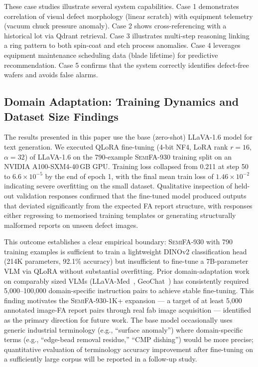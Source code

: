 \documentclass[conference]{IEEEtran}
\newcommand{\semidataset}{\textsc{SemiFA-930}}
\begin{document}
These case studies illustrate several system capabilities.
Case 1 demonstrates correlation of visual defect morphology (linear scratch) with equipment telemetry (vacuum chuck pressure anomaly).
Case 2 shows cross-referencing with a historical lot via Qdrant retrieval.
Case 3 illustrates multi-step reasoning linking a ring pattern to both spin-coat and etch process anomalies.
Case 4 leverages equipment maintenance scheduling data (blade lifetime) for predictive recommendation.
Case 5 confirms that the system correctly identifies defect-free wafers and avoids false alarms.

\subsection{Domain Adaptation: Training Dynamics and Dataset Size Findings}

The results presented in this paper use the base (zero-shot) LLaVA-1.6 model for text generation.
We executed QLoRA fine-tuning (4-bit NF4, LoRA rank $r=16$, $\alpha=32$) of LLaVA-1.6 on the 790-example \semidataset{} training split on an NVIDIA A100-SXM4-40\,GB GPU.
Training loss collapsed from 0.211 at step 50 to $6.6 \times 10^{-5}$ by the end of epoch 1, with the final mean train loss of $1.46 \times 10^{-2}$ indicating severe overfitting on the small dataset.
Qualitative inspection of held-out validation responses confirmed that the fine-tuned model produced outputs that deviated significantly from the expected FA report structure, with responses either regressing to memorised training templates or generating structurally malformed reports on unseen defect images.

This outcome establishes a clear empirical boundary: \semidataset{} with 790 training examples is sufficient to train a lightweight DINOv2 classification head (214K parameters, 92.1\% accuracy) but insufficient to fine-tune a 7B-parameter VLM via QLoRA without substantial overfitting.
Prior domain-adaptation work on comparably sized VLMs (LLaVA-Med~\cite{li2023llava_med}, GeoChat~\cite{kuckreja2024geochat}) has consistently required 5{,}000--100{,}000 domain-specific instruction pairs to achieve stable fine-tuning.
This finding motivates the \semidataset{}-1K+ expansion --- a target of at least 5{,}000 annotated image-FA report pairs through real fab image acquisition --- identified as the primary direction for future work.
The base model occasionally uses generic industrial terminology (e.g., ``surface anomaly'') where domain-specific terms (e.g., ``edge-bead removal residue,'' ``CMP dishing'') would be more precise; quantitative evaluation of terminology accuracy improvement after fine-tuning on a sufficiently large corpus will be reported in a follow-up study.
\end{document}
